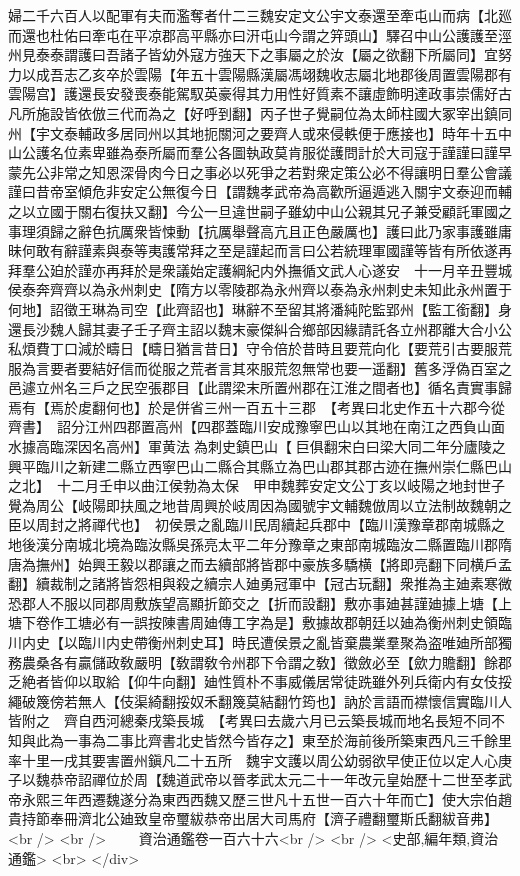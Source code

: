 婦二千六百人以配軍有夫而濫奪者什二三魏安定文公宇文泰還至牽屯山而病【北廵而還也杜佑曰牽屯在平凉郡高平縣亦曰汧屯山今謂之笄頭山】驛召中山公護護至涇州見泰泰謂護曰吾諸子皆幼外寇方強天下之事屬之於汝【屬之欲翻下所屬同】宜努力以成吾志乙亥卒於雲陽【年五十雲陽縣漢屬馮翊魏收志屬北地郡後周置雲陽郡有雲陽宫】護還長安發喪泰能駕馭英豪得其力用性好質素不讓虛飾明達政事崇儒好古凡所施設皆依倣三代而為之【好呼到翻】丙子世子覺嗣位為太師柱國大冢宰出鎮同州【宇文泰輔政多居同州以其地扼關河之要齊人或來侵軼便于應接也】時年十五中山公護名位素卑雖為泰所屬而羣公各圖執政莫肯服從護問計於大司寇于謹謹曰謹早蒙先公非常之知恩深骨肉今日之事必以死爭之若對衆定策公必不得讓明日羣公會議謹曰昔帝室傾危非安定公無復今日【謂魏孝武帝為高歡所逼遁逃入關宇文泰迎而輔之以立國于關右復扶又翻】今公一旦違世嗣子雖幼中山公親其兄子兼受顧託軍國之事理須歸之辭色抗厲衆皆悚動【抗厲舉聲高亢且正色嚴厲也】護曰此乃家事護雖庸昧何敢有辭謹素與泰等夷護常拜之至是謹起而言曰公若統理軍國謹等皆有所依遂再拜羣公廹於謹亦再拜於是衆議始定護綱紀内外撫循文武人心遂安　十一月辛丑豐城侯泰奔齊齊以為永州刺史【隋方以零陵郡為永州齊以泰為永州刺史未知此永州置于何地】詔徵王琳為司空【此齊詔也】琳辭不至留其將潘純陀監郢州【監工銜翻】身還長沙魏人歸其妻子壬子齊主詔以魏末豪傑糾合鄉部因緣請託各立州郡離大合小公私煩費丁口減於疇日【疇日猶言昔日】守令倍於昔時且要荒向化【要荒引古要服荒服為言要者要結好信而從服之荒者言其來服荒忽無常也要一遥翻】舊多浮偽百室之邑遽立州名三戶之民空張郡目【此謂梁末所置州郡在江淮之間者也】循名責實事歸焉有【焉於䖍翻何也】於是併省三州一百五十三郡　【考異曰北史作五十六郡今從齊書】　詔分江州四郡置高州【四郡蓋臨川安成豫寧巴山以其地在南江之西負山面水據高臨深因名高州】軍黄法為刺史鎮巴山【巨俱翻宋白曰梁大同二年分廬陵之興平臨川之新建二縣立西寧巴山二縣合其縣立為巴山郡其郡古迹在撫州崇仁縣巴山之北】　十二月壬申以曲江侯勃為太保　甲申魏葬安定文公丁亥以岐陽之地封世子覺為周公【岐陽即扶風之地昔周興於岐周因為國號宇文輔魏倣周以立法制故魏朝之臣以周封之將禪代也】　初侯景之亂臨川民周續起兵郡中【臨川漢豫章郡南城縣之地後漢分南城北境為臨汝縣吳孫亮太平二年分豫章之東部南城臨汝二縣置臨川郡隋唐為撫州】始興王毅以郡讓之而去續部將皆郡中豪族多驕横【將即亮翻下同横戶孟翻】續裁制之諸將皆怨相與殺之續宗人廸勇冠軍中【冠古玩翻】衆推為主廸素寒微恐郡人不服以同郡周敷族望高顯折節交之【折而設翻】敷亦事廸甚謹廸據上塘【上塘下卷作工塘必有一誤按陳書周廸傳工字為是】敷據故郡朝廷以廸為衡州刺史領臨川内史【以臨川内史帶衡州刺史耳】時民遭侯景之亂皆棄農業羣聚為盗唯廸所部獨務農桑各有贏儲政敎嚴明【敎謂敎令州郡下令謂之敎】徵斂必至【歛力贍翻】餘郡乏絶者皆仰以取給【仰牛向翻】廸性質朴不事威儀居常徒跣雖外列兵衛内有女伎挼繩破篾傍若無人【伎渠綺翻挼奴禾翻篾莫結翻竹筠也】訥於言語而襟懷信實臨川人皆附之　齊自西河總秦戌築長城　【考異曰去歲六月已云築長城而地名長短不同不知與此為一事為二事比齊書北史皆然今皆存之】東至於海前後所築東西凡三千餘里率十里一戌其要害置州鎭凡二十五所　魏宇文護以周公幼弱欲早使正位以定人心庚子以魏恭帝詔禪位於周【魏道武帝以晉孝武太元二十一年改元皇始歷十二世至孝武帝永熙三年西遷魏遂分為東西西魏又歷三世凡十五世一百六十年而亡】使大宗伯趙貴持節奉冊濟北公廸致皇帝璽紱恭帝出居大司馬府【濟子禮翻璽斯氏翻紱音弗】<br />
<br />
　　資治通鑑卷一百六十六<br />
<br />
<史部,編年類,資治通鑑>  <br>
   </div> 

